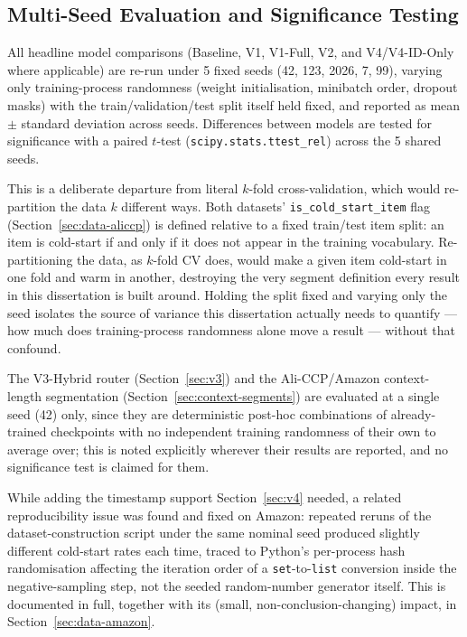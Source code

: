 \documentclass{uclthesis}
\begin{document}
\subsection{Multi-Seed Evaluation and Significance Testing}
\label{sec:metrics-multiseed}

All headline model comparisons (Baseline, V1, V1-Full, V2, and V4/V4-ID-Only where applicable) are re-run under 5 fixed seeds (42, 123, 2026, 7, 99), varying only training-process randomness (weight initialisation, minibatch order, dropout masks) with the train/validation/test split itself held fixed, and reported as mean $\pm$ standard deviation across seeds. Differences between models are tested for significance with a paired $t$-test (\texttt{scipy.stats.ttest\_rel}) across the 5 shared seeds.

This is a deliberate departure from literal $k$-fold cross-validation, which would re-partition the data $k$ different ways. Both datasets' \texttt{is\_cold\_start\_item} flag (Section~\ref{sec:data-aliccp}) is defined relative to a fixed train/test item split: an item is cold-start if and only if it does not appear in the training vocabulary. Re-partitioning the data, as $k$-fold CV does, would make a given item cold-start in one fold and warm in another, destroying the very segment definition every result in this dissertation is built around. Holding the split fixed and varying only the seed isolates the source of variance this dissertation actually needs to quantify --- how much does training-process randomness alone move a result --- without that confound.

The V3-Hybrid router (Section~\ref{sec:v3}) and the Ali-CCP/Amazon context-length segmentation (Section~\ref{sec:context-segments}) are evaluated at a single seed (42) only, since they are deterministic post-hoc combinations of already-trained checkpoints with no independent training randomness of their own to average over; this is noted explicitly wherever their results are reported, and no significance test is claimed for them.

While adding the timestamp support Section~\ref{sec:v4} needed, a related reproducibility issue was found and fixed on Amazon: repeated reruns of the dataset-construction script under the same nominal seed produced slightly different cold-start rates each time, traced to Python's per-process hash randomisation affecting the iteration order of a \texttt{set}-to-\texttt{list} conversion inside the negative-sampling step, not the seeded random-number generator itself. This is documented in full, together with its (small, non-conclusion-changing) impact, in Section~\ref{sec:data-amazon}.
\end{document}
